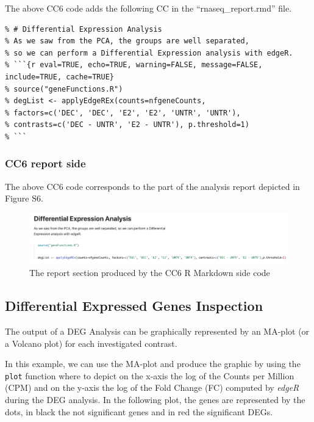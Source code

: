 \documentclass[
]{article}
\begin{document}
The above CC6 code adds the following CC in the ``rnaseq\_report.rmd''
file.

\begin{verbatim}
% # Differential Expression Analysis
% As we saw from the PCA, the groups are well separated, 
% so we can perform a Differential Expression analysis with edgeR.
% ```{r eval=TRUE, echo=TRUE, warning=FALSE, message=FALSE, include=TRUE, cache=TRUE}
% source("geneFunctions.R")
% degList <- applyEdgeREx(counts=nfgeneCounts, 
% factors=c('DEC', 'DEC', 'E2', 'E2', 'UNTR', 'UNTR'), 
% contrasts=c('DEC - UNTR', 'E2 - UNTR'), p.threshold=1)
% ```
\end{verbatim}

\hypertarget{cc6-report-side}{%
\subsubsection{CC6 report side}\label{cc6-report-side}}

The above CC6 code corresponds to the part of the analysis report
depicted in Figure S6.

\begin{figure}[ht]

{\centering \includegraphics[width=0.95\linewidth]{imgs/6} 

}

\caption{The report section produced by the CC6 R Markdown side code}\label{fig:unnamed-chunk-14}
\end{figure}

\newpage

\hypertarget{differential-expressed-genes-inspection}{%
\subsection{Differential Expressed Genes
Inspection}\label{differential-expressed-genes-inspection}}

The output of a DEG Analysis can be graphically represented by an
MA-plot (or a Volcano plot) for each investigated contrast.

In this example, we can use the MA-plot and produce the graphic by using
the \texttt{plot} function where to depict on the x-axis the log of the
Counts per Million (CPM) and on the y-axis the log of the Fold Change
(FC) computed by \emph{edgeR} during the DEG analysis. In the following
plot, the genes are represented by the dots, in black the not
significant genes and in red the significant DEGs.
\end{document}
